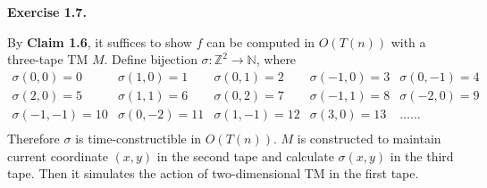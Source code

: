 \documentclass[a4paper]{article}
\newenvironment{exercise}[1]{
	\par
	\noindent\textbf{Exercise #1.}\quad
}{
	\par
	\bigskip
}
\begin{document}
\begin{exercise}{1.7}
    By \textbf{Claim 1.6}, it suffices to show $f$ can be computed in $O(T(n))$ with a three-tape TM $M$.
    Define bijection $\sigma:\mathbb Z^2\to\mathbb N$, where
    $$
    \begin{matrix}
        \sigma(0,0)=0 & \sigma(1,0)=1 & \sigma(0,1)=2 & \sigma(-1,0)=3 & \sigma(0,-1)=4\\
        \sigma(2,0)=5 & \sigma(1,1)=6 & \sigma(0,2)=7 & \sigma(-1,1)=8 & \sigma(-2,0)=9\\
        \sigma(-1,-1)=10 & \sigma(0,-2)=11 & \sigma(1,-1)=12 & \sigma(3,0)=13 & \dots\dots\\
    \end{matrix}
    $$
    Therefore $\sigma$ is time-constructible in $O(T(n))$.
    $M$ is constructed to maintain current coordinate $(x,y)$ in the second tape 
    and calculate $\sigma(x,y)$ in the third tape.
    Then it simulates the action of two-dimensional TM in the first tape.
\end{exercise}
\end{document}

